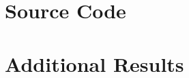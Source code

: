 \documentclass[10pt, a4paper]{report}
\begin{document}
\appendix

\chapter{Source Code}

\chapter{Additional Results}
\end{document}
